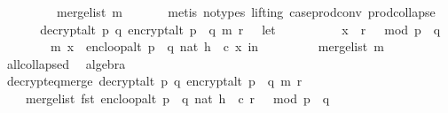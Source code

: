 \begin{isabellebody}
\ \ \ \ \ \ \ \ \ merge{\isacharunderscore}{\kern0pt}list\ m{\isacharparenright}{\kern0pt}{\isachardoublequoteclose}\ \isanewline
\ \ \ \ \isamarkupfalse%
\ {\isacharparenleft}{\kern0pt}metis\ {\isacharparenleft}{\kern0pt}no{\isacharunderscore}{\kern0pt}types{\isacharcomma}{\kern0pt}\ lifting{\isacharparenright}{\kern0pt}\ case{\isacharunderscore}{\kern0pt}prod{\isacharunderscore}{\kern0pt}conv\ prod{\isachardot}{\kern0pt}collapse{\isacharparenright}{\kern0pt}\isanewline
\isanewline
\ \ \isamarkupfalse%
\ \isamarkupfalse%
\ \ {\isachardoublequoteopen}decrypt{\isacharunderscore}{\kern0pt}alt\ p\ q\ {\isacharparenleft}{\kern0pt}encrypt{\isacharunderscore}{\kern0pt}alt\ {\isacharparenleft}{\kern0pt}p\ {\isacharasterisk}{\kern0pt}\ q{\isacharparenright}{\kern0pt}\ m\ r{\isacharparenright}{\kern0pt}\ {\isacharequal}{\kern0pt}\ \ {\isacharparenleft}{\kern0pt}let\ \isanewline
\ \ \ \ \ \ \ \ \ x{\isacharunderscore}{\kern0pt}{}\ {\isacharequal}{\kern0pt}\ r\ {\isacharcircum}{\kern0pt}\ {}\ mod\ {\isacharparenleft}{\kern0pt}p\ {\isacharasterisk}{\kern0pt}\ q{\isacharparenright}{\kern0pt}{\isacharsemicolon}{\kern0pt}\isanewline
\ \ \ \ \ \ \ \ {\isacharparenleft}{\kern0pt}m{\isacharcomma}{\kern0pt}\ x{\isacharprime}{\kern0pt}{\isacharparenright}{\kern0pt}\ {\isacharequal}{\kern0pt}\ enc{\isacharunderscore}{\kern0pt}loop{\isacharunderscore}{\kern0pt}alt\ {\isacharparenleft}{\kern0pt}p\ {\isacharasterisk}{\kern0pt}\ q{\isacharcomma}{\kern0pt}\ {\isacharparenleft}{\kern0pt}nat\ h{\isacharparenright}{\kern0pt}\ {\isacharcomma}{\kern0pt}\ c{\isacharparenright}{\kern0pt}\ x{\isacharunderscore}{\kern0pt}{}\ in\isanewline
\ \ \ \ \ \ \ \ \ merge{\isacharunderscore}{\kern0pt}list\ m{\isacharparenright}{\kern0pt}{\isachardoublequoteclose}\ \isamarkupfalse%
\ all{\isacharunderscore}{\kern0pt}collapsed\ \isamarkupfalse%
\ algebra\isanewline
\ \ \isamarkupfalse%
\ \isamarkupfalse%
\ decrypt{\isacharunderscore}{\kern0pt}eq{\isacharunderscore}{\kern0pt}merge{\isacharcolon}{\kern0pt}\ {\isachardoublequoteopen}decrypt{\isacharunderscore}{\kern0pt}alt\ p\ q\ {\isacharparenleft}{\kern0pt}encrypt{\isacharunderscore}{\kern0pt}alt\ {\isacharparenleft}{\kern0pt}p\ {\isacharasterisk}{\kern0pt}\ q{\isacharparenright}{\kern0pt}\ m\ r{\isacharparenright}{\kern0pt}\ {\isacharequal}{\kern0pt}\ \isanewline
\ \ \ \ merge{\isacharunderscore}{\kern0pt}list\ {\isacharparenleft}{\kern0pt}fst\ {\isacharparenleft}{\kern0pt}enc{\isacharunderscore}{\kern0pt}loop{\isacharunderscore}{\kern0pt}alt\ {\isacharparenleft}{\kern0pt}p\ {\isacharasterisk}{\kern0pt}\ q{\isacharcomma}{\kern0pt}\ {\isacharparenleft}{\kern0pt}nat\ h{\isacharparenright}{\kern0pt}\ {\isacharcomma}{\kern0pt}\ c{\isacharparenright}{\kern0pt}\ {\isacharparenleft}{\kern0pt}r\ {\isacharcircum}{\kern0pt}\ {}\ mod\ {\isacharparenleft}{\kern0pt}p\ {\isacharasterisk}{\kern0pt}\ q{\isacharparenright}{\kern0pt}{\isacharparenright}{\kern0pt}{\isacharparenright}{\kern0pt}{\isacharparenright}{\kern0pt}{\isachardoublequoteclose}\ \isamarkupfalse%

\end{isabellebody}
